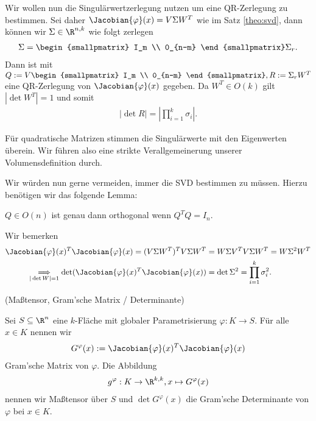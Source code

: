 \documentclass[a4paper,11pt]{article}
\begin{document}
Wir wollen nun die Singulärwertzerlegung nutzen um eine QR-Zerlegung zu bestimmen. Sei daher $\Jacobian{\varphi}(x) = V \Sigma W^T$ wie im Satz \ref{theo:svd}, dann können wir $\Sigma \in \R^{n,k}$ wie folgt zerlegen
\begin{align*}
    \Sigma = \begin{smallpmatrix}
        I_m \\
        0_{n-m}
    \end{smallpmatrix} \Sigma_r.
\end{align*}
Dann ist mit $Q := V \begin{smallpmatrix}
        I_m \\
        0_{n-m}
    \end{smallpmatrix}, R := \Sigma_r W^T$ eine QR-Zerlegung von $\Jacobian{\varphi}(x)$ gegeben. Da $W^T \in O(k)$ gilt $|\det W^T| = 1$ und somit
\begin{align*}
    |\det R| = \left|\prod_{i=1}^k \sigma_i \right|.
\end{align*}

\begin{remark}
    Für quadratische Matrizen stimmen die Singulärwerte mit den Eigenwerten überein. Wir führen also eine strikte Verallgemeinerung unserer Volumensdefinition durch.
\end{remark}

Wir würden nun gerne vermeiden, immer die SVD bestimmen zu müssen.
Hierzu benötigen wir das folgende Lemma:
\begin{lemma}
    $Q \in O(n)$ ist genau dann orthogonal wenn $Q^T Q = I_n$.
\end{lemma}

Wir bemerken
\begin{align*}
    \Jacobian{\varphi}(x)^T \Jacobian{\varphi}(x) = (V \Sigma W^T)^T V \Sigma W^T          & = W \Sigma V^T V \Sigma W^T = W \Sigma^2 W^T \\
    \underset{|\det W| = 1}{\implies} \det (\Jacobian{\varphi}(x)^T \Jacobian{\varphi}(x)) & = \det \Sigma^2 = \prod_{i=1}^k \sigma_i^2.
\end{align*}

\begin{definition}{(Maßtensor, Gram'sche Matrix / Determinante)}

    Sei $S \subseteq \R^n$ eine $k$-Fläche mit globaler Parametrisierung $\varphi : K \to S$. Für alle $x \in K$ nennen wir
    \begin{align*}
        G^\varphi(x) := \Jacobian{\varphi}(x)^T \Jacobian{\varphi}(x)
    \end{align*}
    Gram'sche Matrix von $\varphi$.
    Die Abbildung
    \begin{align*}
        g^\varphi : K \to \R^{k, k}, x \mapsto G^\varphi(x)
    \end{align*}
    nennen wir Maßtensor über $S$ und $\det G^\varphi(x)$ die Gram'sche Determinante von $\varphi$ bei $x \in K$.
\end{definition}
\end{document}
